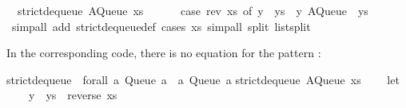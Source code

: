 \begin{isabellebody}
\ \ {}strict{}dequeue\ {}AQueue\ xs\ {}{}{}\ {}\isanewline
\ \ \ \ {}case\ rev\ xs\ of\ y\ {}\ ys\ {}\ {}y{}\ AQueue\ {}{}\ ys{}{}{}\isanewline
\ \ \isamarkupfalse%
\ {}simp{}all\ add{}\ strict{}dequeue{}def{}\ {}cases\ xs{}\ simp{}all\ split{}\ list{}split{}%
\endisatagquote
{\isafoldquote}%
%
\isadelimquote
%
\endisadelimquote
%
\begin{isamarkuptext}%
\noindent In the corresponding code, there is no equation
  for the pattern :%
\end{isamarkuptext}%
\isamarkuptrue%
%
\isadelimquotetypewriter
%
\endisadelimquotetypewriter
%
\isatagquotetypewriter
%
\begin{isamarkuptext}%
strict{}dequeue\ {}{}\ forall\ a{}\ Queue\ a\ {}{}\ {}a{}\ Queue\ a{}{}\isanewline
strict{}dequeue\ {}AQueue\ xs\ {}{}{}\ {}\isanewline
\ \ let\ {}\isanewline
\ \ \ \ {}y\ {}\ ys{}\ {}\ reverse\ xs{}\isanewline

\end{isamarkuptext}
\end{isabellebody}
